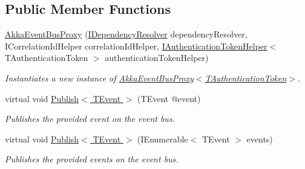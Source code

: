 \subsection*{Public Member Functions}
\begin{DoxyCompactItemize}
\item 
\hyperlink{classCqrs_1_1Akka_1_1Events_1_1AkkaEventBusProxy_a2f886b4e9e64188fe69478c39c96f2b5_a2f886b4e9e64188fe69478c39c96f2b5}{Akka\+Event\+Bus\+Proxy} (\hyperlink{interfaceCqrs_1_1Configuration_1_1IDependencyResolver}{I\+Dependency\+Resolver} dependency\+Resolver, I\+Correlation\+Id\+Helper correlation\+Id\+Helper, \hyperlink{interfaceCqrs_1_1Authentication_1_1IAuthenticationTokenHelper}{I\+Authentication\+Token\+Helper}$<$ T\+Authentication\+Token $>$ authentication\+Token\+Helper)
\begin{DoxyCompactList}\small\item\em Instantiates a new instance of \hyperlink{classCqrs_1_1Akka_1_1Events_1_1AkkaEventBusProxy_a2f886b4e9e64188fe69478c39c96f2b5_a2f886b4e9e64188fe69478c39c96f2b5}{Akka\+Event\+Bus\+Proxy$<$\+T\+Authentication\+Token$>$}. \end{DoxyCompactList}\item 
virtual void \hyperlink{classCqrs_1_1Akka_1_1Events_1_1AkkaEventBusProxy_a656daead2fe6f30487855dbaea5a3c83_a656daead2fe6f30487855dbaea5a3c83}{Publish$<$ T\+Event $>$} (T\+Event @event)
\begin{DoxyCompactList}\small\item\em Publishes the provided {\itshape event}  on the event bus. \end{DoxyCompactList}\item 
virtual void \hyperlink{classCqrs_1_1Akka_1_1Events_1_1AkkaEventBusProxy_af4c202eaab00ed2fb6160d5b114d935c_af4c202eaab00ed2fb6160d5b114d935c}{Publish$<$ T\+Event $>$} (I\+Enumerable$<$ T\+Event $>$ events)
\begin{DoxyCompactList}\small\item\em Publishes the provided {\itshape events}  on the event bus. \end{DoxyCompactList}\end{DoxyCompactItemize}
